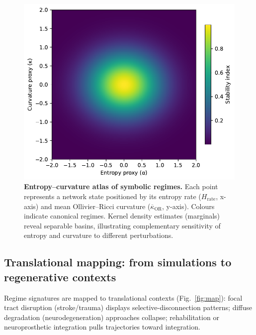 \documentclass[fleqn,10pt]{wlscirep}
\begin{document}
\begin{figure}[htbp]\centering
\includegraphics[width=\linewidth]{Fig_symbolic_heatmap.pdf}
\caption{\textbf{Entropy--curvature atlas of symbolic regimes.} Each point represents a network state positioned by its entropy rate ($H_{\mathrm{rate}}$, x-axis) and mean Ollivier--Ricci curvature ($\overline{\kappa}_{\mathrm{OR}}$, y-axis). Colours indicate canonical regimes. Kernel density estimates (marginals) reveal separable basins, illustrating complementary sensitivity of entropy and curvature to different perturbations.}
\label{fig:heatmap}
\end{figure}

\subsection*{Translational mapping: from simulations to regenerative contexts}
Regime signatures are mapped to translational contexts (Fig.~\ref{fig:map}): focal tract disruption (stroke/trauma) displays selective-disconnection patterns; diffuse degradation (neurodegeneration) approaches collapse; rehabilitation or neuroprosthetic integration pulls trajectories toward integration.
\end{document}
